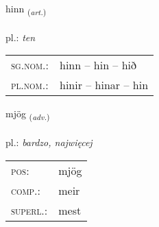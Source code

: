 \documentclass[frontgrid, backgrid]{flacards}\usepackage[]{graphicx}\usepackage[]{xcolor}
\begin{document}
\renewcommand{\blhead}{\vskip5pt {\small\bfseries\footnotesize Greinir | article }}
\renewcommand{\bcfoot}{\vskip5pt \hspace{2pt}{\small\bfseries\footnotesize 1K}}


{hinn \small{\textsubscript{(\textit{art.})}} \\[1ex] %
\textphonetic{[hɪn]} \\
pl.: \emph{ten} \\  [2ex]
\renewcommand*{\arraystretch}{0.8}
\begin{tabular}{ll}
\textsc{sg.nom.}: & hinn  --  hin -- hið \\ 
\textsc{pl.nom.}: & hinir -- hinar -- hin
\end{tabular}
}

\renewcommand{\flhead}{\vskip5pt \fboxsep=0pt {\small\bfseries\footnotesize Atviksorð | przysłówek}}
\renewcommand{\fcfoot}{\vskip5pt \fboxsep=0pt \hspace{2pt}{\small\bfseries\footnotesize 1K}}

\renewcommand{\blhead}{\vskip5pt {\small\bfseries\footnotesize Atviksorð | przysłówek }}
\renewcommand{\bcfoot}{\vskip5pt \hspace{2pt}{\small\bfseries\footnotesize 1K}}


{mjög \small{\textsubscript{(\textit{adv.})}} \\[1ex] %
\textphonetic{[mjœːɣ]} \\
pl.: \emph{bardzo, najwięcej} \\  [2ex]
\renewcommand*{\arraystretch}{0.8}
\begin{tabular}{ll}
\textsc{pos}: & mjög \\ 
\textsc{comp.}: & meir \\ 
\textsc{superl.}: & mest \\
\end{tabular}
}

\renewcommand{\flhead}{\vskip5pt \fboxsep=0pt {\small\bfseries\footnotesize Sagnorð | czasownik}}
\renewcommand{\fcfoot}{\vskip5pt \fboxsep=0pt \hspace{2pt}{\small\bfseries\footnotesize 1K}}
\end{document}
